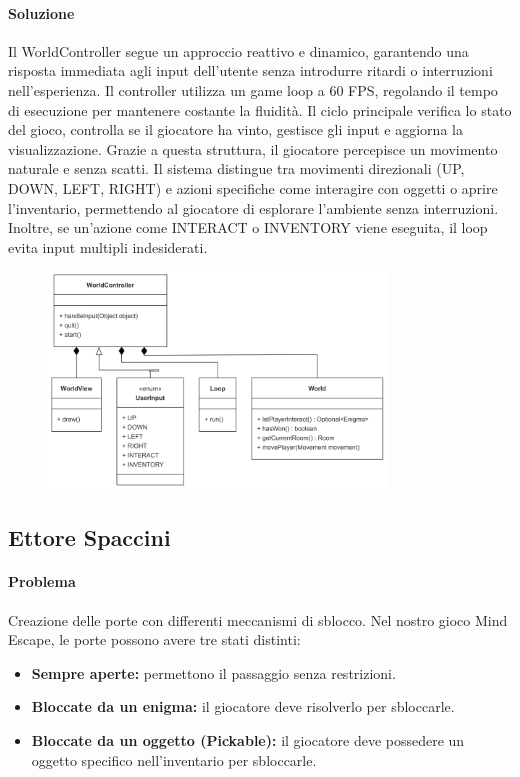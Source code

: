 \documentclass[a4paper,12pt]{report}
\begin{document}
\paragraph{Soluzione} Il WorldController segue un approccio reattivo e dinamico, garantendo una risposta immediata agli input dell’utente senza introdurre ritardi o interruzioni nell’esperienza.
Il controller utilizza un game loop a 60 FPS, regolando il tempo di esecuzione per mantenere costante la fluidità. Il ciclo principale verifica lo stato del gioco, controlla se il giocatore ha vinto, gestisce gli input e aggiorna la visualizzazione. Grazie a questa struttura, il giocatore percepisce un movimento naturale e senza scatti.
Il sistema distingue tra movimenti direzionali (UP, DOWN, LEFT, RIGHT) e azioni specifiche come interagire con oggetti o aprire l’inventario, permettendo al giocatore di esplorare l’ambiente senza interruzioni. Inoltre, se un’azione come INTERACT o INVENTORY viene eseguita, il loop evita input multipli indesiderati.
\begin{figure}[h]  %
    \centering
    \includegraphics[width=0.8\textwidth]{img/worldController.png}  %
    \label{img:worldController}
\end{figure}
%
\subsection{Ettore Spaccini}
%
\paragraph{Problema} %
Creazione delle porte con differenti meccanismi di sblocco.
Nel nostro gioco Mind Escape, le porte possono avere tre stati distinti:
\begin{itemize}
	\item \textbf{Sempre aperte:} permettono il passaggio senza restrizioni.
	\item \textbf{Bloccate da un enigma:} il giocatore deve risolverlo per sbloccarle.
	\item \textbf{Bloccate da un oggetto (Pickable):} il giocatore deve possedere un oggetto specifico nell’inventario per sbloccarle.
\end{itemize}
\end{document}
